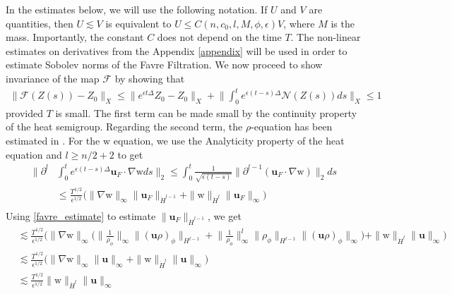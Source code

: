 \documentclass[11pt,letterpaper]{amsart}
\theoremstyle{plain}
\theoremstyle{definition}
\theoremstyle{remark}
\renewcommand{\geq}{\geqslant}
\renewcommand{\leq}{\leqslant}
\def\Hldot{\dot{H}^l}
\def\u{\textbf{u}}
\def\uavg{\u_F}
\def \wt {\mathrm{w}}
\begin{document}
In the estimates below, we will use the following notation. 
If $U$ and $V$ are quantities, then $U \lesssim V$ is equivalent to 
$U \leq C(n, c_0, l, M, \phi, \epsilon) V$, where $M$ is the mass. Importantly, the constant $C$ 
does not depend on the time $T$. 
The non-linear estimates on derivatives from the Appendix \ref{appendix} 
will be used in order to estimate Sobolev norms of the Favre Filtration. 
We now proceed to show invariance of the map $\mathcal{F}$ by showing that
\begin{align*}
    \|\mathcal{F}(Z(s)) - Z_0\|_X \leq 
        \Big\| e^{\epsilon t \Delta} Z_0 - Z_0 \Big\|_X + \Big\| 
            \int_0^t e^{\epsilon (t-s) \Delta} \mathcal{N}(Z(s)) ds \Big\|_X 
            \leq 1
\end{align*}
provided $T$ is small. 
The first term can be made small by the continuity property of the heat semigroup. 
Regarding the second term, the $\rho$-equation has been estimated in \cite{Sbook}. 
For the $\wt$ equation, we use the Analyticity property of the heat equation 
and $l \geq n/2+2$ to get   
\begin{align*}
    \Big\| \partial^l 
        &\int_0^t e^{\epsilon(t-s) \Delta} \u_F \cdot \nabla \wt ds \Big\|_2
            \leq \int_0^t \frac{1}{\sqrt{\epsilon(t-s)}} \big\| \partial^{l-1} ( \u_F \cdot \nabla \wt) \big\|_2 ds \\
            &\leq \frac{T^{1/2}}{\epsilon^{1/2}} \Big( \|\nabla \wt\|_{\infty} \|\uavg\|_{\dot{H}^{l-1}} + \| \wt \|_{\Hldot} \|\uavg\|_{\infty} \Big) \\
\end{align*}
Using \ref{favre_estimate} to estimate $\|\uavg\|_{\dot{H}^{l-1}}$, we get 
\begin{align*}
    &\lesssim \frac{T^{1/2}}{\epsilon^{1/2}} 
         \Big( 
            \|\nabla \wt\|_{\infty}  \Big( \Big\| \frac{1}{\rho_{\phi}} \Big\|_{\infty} \|(\u \rho)_{\phi} \|_{H^{l-1}}
            + \Big\| \frac{1}{\rho_{\phi}} \Big\|_{\infty}^{l} \| \rho_{\phi} \|_{H^{l-1}} \|(\u \rho)_{\phi} \|_{\infty} \Big)
            + \| \wt \|_{\dot{H}^{l}} \|\u\|_{\infty} \Big) \\
    &\lesssim \frac{T^{1/2}}{\epsilon^{1/2}} 
        \Big( 
            \|\nabla \wt\|_{\infty}  \|\u\|_{\infty} 
            + \| \wt \|_{\dot{H}^{l}} \|\u\|_{\infty} \Big) \\
    &\lesssim \frac{T^{1/2}}{\epsilon^{1/2}} 
            \| \wt \|_{\dot{H}^{l}} \|\u\|_{\infty} \\
\end{align*}
\end{document}

